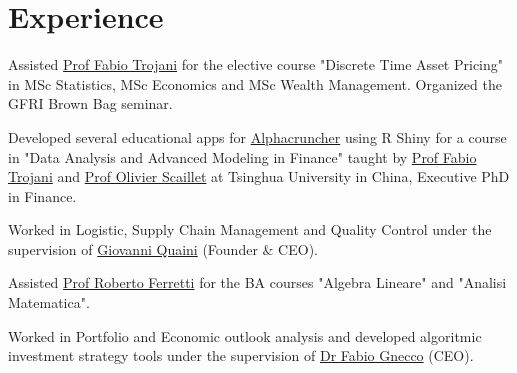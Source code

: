 \documentclass[]{deedy-resume-openfont}
\begin{document}
\begin{minipage}[t]{0.66\textwidth} 


\section{Experience}

\vspace{\topsep} 
Assisted \href{http://www.people.usi.ch/trojanif/}{Prof Fabio Trojani} for the elective course "Discrete Time Asset Pricing"
in MSc Statistics, MSc Economics and MSc Wealth Management.
Organized the GFRI Brown Bag seminar.
\sectionsep

Developed several educational apps for \href{http://alphacruncher.com/}{Alphacruncher} 
using R Shiny for a course in "Data Analysis and Advanced Modeling in Finance" taught by 
\href{http://www.people.usi.ch/trojanif/}{Prof Fabio Trojani}
and \href{http://www.scaillet.ch/Home_Page_of_Olivier_Scaillet.htm}{Prof Olivier Scaillet}
at Tsinghua University in China, Executive PhD in Finance.
\sectionsep

Worked in Logistic, Supply Chain Management and Quality Control under the supervision
of \href{mailto:gio.quaini@gmail.com}{Giovanni Quaini} (Founder \& CEO).
\sectionsep

Assisted \href{https://www.linkedin.com/in/roberto-ferretti-975697a/}{Prof Roberto Ferretti} 
for the BA courses "Algebra Lineare" and "Analisi Matematica".
\sectionsep

Worked in Portfolio and Economic outlook analysis and
developed algoritmic investment strategy tools under the supervision of
\href{https://www.linkedin.com/in/fabio-gnecco-172b156/}{Dr Fabio Gnecco} (CEO).
\sectionsep



\end{minipage}
\end{document}

